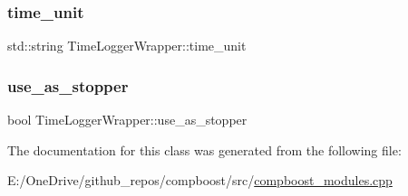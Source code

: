 \subsubsection{\texorpdfstring{time\+\_\+unit}{time\_unit}}
{\footnotesize\ttfamily std\+::string Time\+Logger\+Wrapper\+::time\+\_\+unit\hspace{0.3cm}{\ttfamily [private]}}

\mbox{\label{class_time_logger_wrapper_a00f5b655adb9bf054e6f0b8f7b8be225}} 
\subsubsection{\texorpdfstring{use\+\_\+as\+\_\+stopper}{use\_as\_stopper}}
{\footnotesize\ttfamily bool Time\+Logger\+Wrapper\+::use\+\_\+as\+\_\+stopper\hspace{0.3cm}{\ttfamily [private]}}



The documentation for this class was generated from the following file\+:\begin{DoxyCompactItemize}
\item 
E\+:/\+One\+Drive/github\+\_\+repos/compboost/src/\mbox{\hyperlink{compboost__modules_8cpp}{compboost\+\_\+modules.\+cpp}}\end{DoxyCompactItemize}
